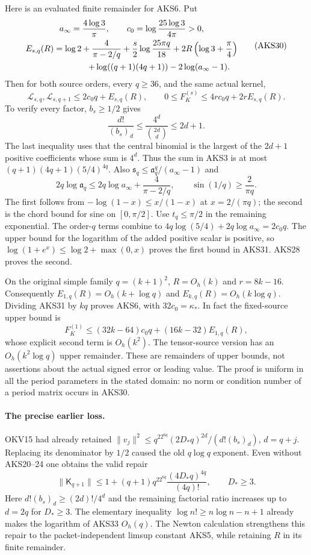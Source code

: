 Here is an evaluated finite remainder for AKS6. Put
\[
\begin{gathered}
 a_\infty=\frac{4\log3}{\pi},\qquad
 c_0=\log\frac{25\log3}{4\pi}>0,\\
 E_{s,q}(R)=\log2+\frac4{\pi-2/q}
  +\frac{s}{2}\log\frac{25\pi q}{18}
  +2R\left(\log3+\frac\pi4\right)\\
 \hspace{23mm}+\log((q+1)(4q+1))-2\log(a_\infty-1).
\end{gathered}\tag{AKS30}
\]
Then for both source orders, every $q\ge36$, and the same actual kernel,
\[
 \boxed{\quad
 \mathcal L_{s,q},\mathcal L_{s,q+1}\le2c_0q+E_{s,q}(R),\qquad
 0\le F_K^{(s)}\le4rc_0q+2rE_{s,q}(R).
 \quad}\tag{AKS31}
\]
To verify every factor, $b_s\ge1/2$ gives
\[
 \frac{d!}{(b_s)_d}\le\frac{4^d}{\binom{2d}{d}}\le2d+1.
\]
The last inequality uses that the central binomial is the largest of the
$2d+1$ positive coefficients whose sum is $4^d$. Thus the sum in AKS3
is at most $(q+1)(4q+1)(5/4)^{4q}$. Also
$\mathfrak s_q\le \mathfrak a_q^q/(a_\infty-1)$ and
\[
 2q\log \mathfrak a_q\le2q\log a_\infty+\frac4{\pi-2/q},\qquad
 \sin(1/q)\ge\frac2{\pi q}.
\]
The first follows from $-\log(1-x)\le x/(1-x)$ at $x=2/(\pi q)$;
the second is the chord bound for sine on $[0,\pi/2]$.
Use $t_q\le\pi/2$ in the remaining exponential. The order-$q$ terms
combine to
$4q\log(5/4)+2q\log a_\infty=2c_0q$.
The upper bound for the logarithm of the added positive scalar is
positive, so $\log(1+e^x)\le\log2+\max(0,x)$ proves the first bound in
AKS31. AKS28 proves the second.

On the original simple family $q=(k+1)^2$, $R=O_h(k)$ and
$r=8k-16$. Consequently $E_{1,q}(R)=O_h(k+\log q)$ and
$E_{k,q}(R)=O_h(k\log q)$. Dividing AKS31 by $kq$ proves AKS6, with
$32c_0=\kappa_*$. In fact the fixed-source upper bound is
\[
 F_K^{(1)}\le(32k-64)c_0q+(16k-32)E_{1,q}(R),
 \tag{AKS32}
\]
whose explicit second term is $O_h(k^2)$. The tensor-source version has
an $O_h(k^2\log q)$ upper remainder. These are remainders of upper
bounds, not assertions about the actual signed error or leading value.
The proof is uniform in all the period parameters in the stated domain:
no norm or condition number of a period matrix occurs in AKS30.

\paragraph{The precise earlier loss.}
OKV15 had already retained
$\|v_j\|^2\le q^22^{6q}(2D_*q)^{2d}/(d!(b_s)_d)$, $d=q+j$.
Replacing its denominator by $1/2$ caused the old $q\log q$ exponent.
Even without AKS20--24 one obtains the valid repair
\[
 \|\mathsf K_{q+1}\|\le
 1+(q+1)q^22^{6q}\frac{(4D_*q)^{4q}}{(4q)!},\qquad D_*\ge3.
 \tag{AKS33}
\]
Here $d!(b_s)_d\ge(2d)!/4^d$ and the remaining factorial ratio increases
up to $d=2q$ for $D_*\ge3$. The elementary inequality
$\log n!\ge n\log n-n+1$ already makes the logarithm of AKS33 $O_h(q)$.
The Newton calculation strengthens this repair to the packet-independent
limsup constant AKS5, while retaining $R$ in its finite remainder.


